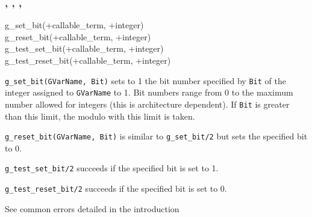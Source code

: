 \subsubsection{,
               ,
               ,
               }

\begin{TemplatesOneCol}
g\_set\_bit(+callable\_term, +integer) \\
g\_reset\_bit(+callable\_term, +integer) \\
g\_test\_set\_bit(+callable\_term, +integer) \\
g\_test\_reset\_bit(+callable\_term, +integer)

\end{TemplatesOneCol}

\Description

\texttt{g\_set\_bit(GVarName, Bit)} sets to 1 the bit number specified by
\texttt{Bit} of the integer assigned to \texttt{GVarName} to 1. Bit numbers
range from 0 to the maximum number allowed for integers (this is architecture dependent). If \texttt{Bit} is greater than this limit,
the modulo with this limit is taken.

\texttt{g\_reset\_bit(GVarName, Bit)} is similar to \texttt{g\_set\_bit/2} but
sets the specified bit to 0.

\texttt{g\_test\_set\_bit/2} succeeds if the specified bit is set to 1.

\texttt{g\_test\_reset\_bit/2} succeeds if the specified bit is set to 0.

\Errors

See common errors detailed in the introduction 

\begin{PlErrorsNoTitle}






\end{PlErrorsNoTitle}

